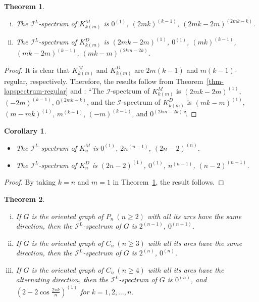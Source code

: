 \documentclass[12pt]{article}
\numberwithin{equation}{section}
\newtheorem{thm}{Theorem}[section]
\newtheorem{cor}{Corollary}[section]
\begin{document}
	\begin{thm}\label{laplaciancomplete}
		\begin{enumerate}[(i)]
			\item The $\mathcal{I}^L$-spectrum of $K^M_{k(m)}$ is $0^{(1)}$, $(2mk)^{(k-1)}$, $(2mk-2m)^{(2mk-k)}$.
			\item The $\mathcal{I}^L$-spectrum of $K^D_{k(m)}$ is $(2mk-2m)^{(1)}$, $0^{(1)}$, $(mk)^{(k-1)}$, $(mk-2m)^{(k-1)}$, $(mk-m)^{(2km-2k)}$.
		\end{enumerate}
	\end{thm}
	\begin{proof}
		It is clear that $K^M_{k(m)}$ and $K^D_{k(m)}$ are $2m(k-1)$ and $m(k-1)$-regular, respectively. Therefore, the results follow from Theorem~\ref{thm-lapspectrum-regular} and \cite[Theorem~5.3]{Kalaimatrices1}: 
		``The $\mathcal{I}$-spectrum of $K^M_{k(m)}$ is $(2mk-2m)^{(1)}$, $(-2m)^{(k-1)}$, $0^{(2mk-k)}$, and
		the $\mathcal{I}$-spectrum of $K^D_{k(m)}$ is $(mk-m)^{(1)}$, $(m-mk)^{(1)}$, $m^{(k-1)}$, $(-m)^{(k-1)}$, and $0^{(2km-2k)}$''.
	\end{proof}
	\begin{cor}
		\begin{itemize}
			\item[(i)] The $\mathcal{I}^L$-spectrum of $K^M_n$ is  $0^{(1)}$, $2n^{(n-1)}$, $(2n-2)^{(n)}$.
			\item[(ii)] The $\mathcal{I}^L$-spectrum of $K^D_n$ is $(2n-2)^{(1)}$, $0^{(1)}$, $n^{(n-1)}$, $(n-2)^{(n-1)}$.
		\end{itemize}
	\end{cor}
	\begin{proof}
		By taking $k=n$ and $m=1$ in Theorem~\ref{laplaciancomplete}, the result follows.
	\end{proof}
	\begin{thm}\label{orientedLaplacian}
		\begin{enumerate}[(i)]
			\item If $G$ is the oriented graph of $P_n~(n\geq2)$ with all its arcs have the same direction, then the $\mathcal{I}^L$-spectrum of $G$ is $2^{(n-1)}$, $0^{(n+1)}$.
			\item If $G$ is the oriented graph of $C_n~(n\geq3)$ with all its arcs have the same direction, then the $\mathcal{I}^L$-spectrum of $G$ is $2^{(n)}$, $0^{(n)}$.
			\item If $G$ is the oriented graph of $C_n~(n\geq4)$ with all its arcs have the alternating direction, then the $\mathcal{I}^L$-spectrum of $G$ is $0^{(n)}$, and $(2-2\cos\frac{2\pi k}{n})^{(1)}$ for $k=1,2,\ldots,n$.
		\end{enumerate}
	\end{thm}
\end{document}
